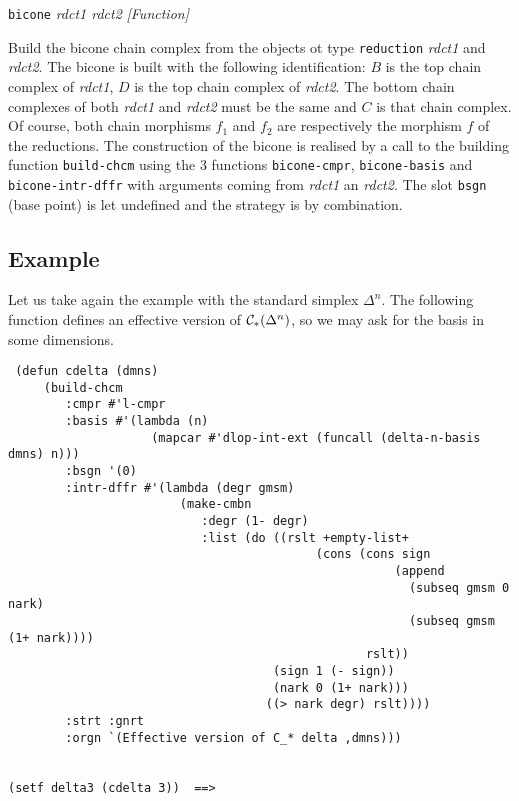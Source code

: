 {\parindent=0mm
{\leftskip=5mm 
{\tt bicone} {\em rdct1 rdct2} \hfill {\em [Function]} \par}
{\leftskip=15mm 
Build the bicone chain complex from the objects ot type {\tt reduction} {\em rdct1} and {\em rdct2}.
The bicone is built with the following identification: $B$ is the top chain complex of {\em rdct1},
$D$ is the top chain complex of {\em rdct2}. The bottom chain complexes of both {\em rdct1} and {\em rdct2}
must be the same and $C$ is  that chain complex. Of course, both chain morphisms $f_1$ and
$f_2$ are respectively the morphism $f$ of the reductions. The construction of the bicone is realised
by a call to the building function {\tt build-chcm} using the $3$ functions {\tt bicone-cmpr}, 
{\tt bicone-basis} and {\tt bicone-intr-dffr} with arguments coming from {\em rdct1} an {\em rdct2}. 
The slot {\tt bsgn} (base point) is let undefined and the strategy is by combination. \par}

\subsection* {Example}

Let us take again the example with the standard simplex $\Delta^n$. The following function
defines an effective version of ${\cal C}_*(\Delta^n)$, so we may ask for the basis in some dimensions.
{\footnotesize\begin{verbatim}
 (defun cdelta (dmns)
     (build-chcm
        :cmpr #'l-cmpr
        :basis #'(lambda (n)
                    (mapcar #'dlop-int-ext (funcall (delta-n-basis dmns) n)))
        :bsgn '(0)
        :intr-dffr #'(lambda (degr gmsm)
                        (make-cmbn
                           :degr (1- degr)
                           :list (do ((rslt +empty-list+
                                           (cons (cons sign 
                                                      (append
                                                        (subseq gmsm 0 nark)
                                                        (subseq gmsm (1+ nark))))
                                                  rslt))
                                     (sign 1 (- sign))
                                     (nark 0 (1+ nark)))
                                    ((> nark degr) rslt))))                                           
        :strt :gnrt
        :orgn `(Effective version of C_* delta ,dmns)))


(setf delta3 (cdelta 3))  ==>


\end{verbatim}}}
